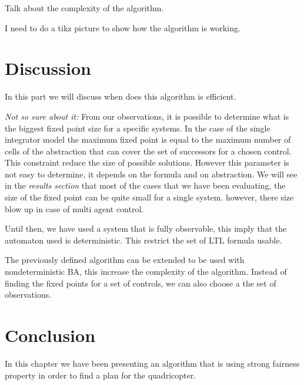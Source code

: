 Talk about the complexity of the algorithm.

I need to do a tikz picture to show how the algorithm is working.

\section{Discussion}
In this part we will discuss when does this algorithm is efficient.

\textit{Not so sure about it:}
From our observations, it is possible to determine what is the biggest fixed point size for a specific systems.
In the case of the single integrator model the maximum fixed point is equal to the maximum number of cells of the abstraction that can cover the set of successors for a chosen control.
This constraint reduce the size of possible solutions.
However this parameter is not easy to determine, it depends on the formula and on abstraction.
We will see in the \textit{results section} that most of the cases that we have been evaluating, the size of the fixed point can be quite small for a single system. however, there size blow up in case of multi agent control.

Until then, we have used a system that is fully observable, this imply that the \buchi{} automaton used is deterministic.
This restrict the set of LTL formula usable. 

The previously defined algorithm can be extended to be used with nondeterministic BA, this increase the complexity of the algorithm. 
Instead of finding the fixed points for a set of controls, we can also choose a the set of observations.

\section{Conclusion}
In this chapter we have been presenting an algorithm that is using strong fairness property in order to find a plan for the quadricopter.